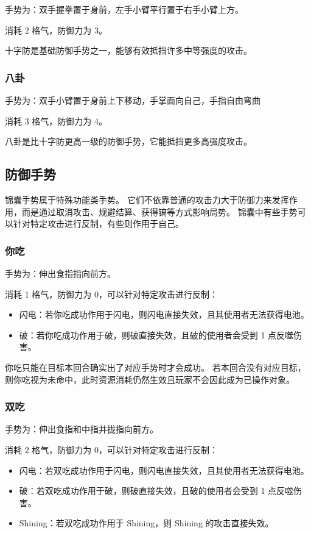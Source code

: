 \documentclass[12pt]{ctexart}
\begin{document}
手势为：双手握拳置于身前，左手小臂平行置于右手小臂上方。

消耗 2 格气，防御力为 3。

十字防是基础防御手势之一，能够有效抵挡许多中等强度的攻击。

\subsubsection{八卦}

手势为：双手小臂置于身前上下移动，手掌面向自己，手指自由弯曲

消耗 3 格气，防御力为 4。

八卦是比十字防更高一级的防御手势，它能抵挡更多高强度攻击。

\subsection{防御手势}

锦囊手势属于特殊功能类手势。
它们不依靠普通的攻击力大于防御力来发挥作用，而是通过取消攻击、规避结算、获得镐等方式影响局势。
锦囊中有些手势可以针对特定攻击进行反制，有些则作用于自己。

\subsubsection{你吃}

手势为：伸出食指指向前方。

消耗 1 格气，防御力为 0，可以针对特定攻击进行反制：

\begin{itemize}
    \item 闪电：若你吃成功作用于闪电，则闪电直接失效，且其使用者无法获得电池。
    \item 破：若你吃成功作用于破，则破直接失效，且破的使用者会受到 1 点反噬伤害。
\end{itemize}

你吃只能在目标本回合确实出了对应手势时才会成功。
若本回合没有对应目标，则你吃视为未命中，此时资源消耗仍然生效且玩家不会因此成为已操作对象。

\subsubsection{双吃}

手势为：伸出食指和中指并拢指向前方。

消耗 2 格气，防御力为 0，可以针对特定攻击进行反制：

\begin{itemize}
    \item 闪电：若双吃成功作用于闪电，则闪电直接失效，且其使用者无法获得电池。
    \item 破：若双吃成功作用于破，则破直接失效，且破的使用者会受到 1 点反噬伤害。
    \item Shining：若双吃成功作用于 Shining，则 Shining 的攻击直接失效。
\end{itemize}
\end{document}
